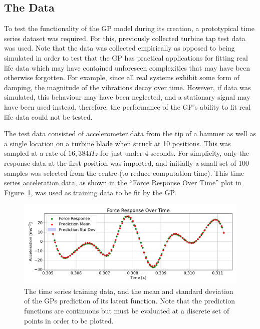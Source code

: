 \documentclass[12pt]{article}
\begin{document}
    \subsection{The Data}
    To test the functionality of the GP model during its creation, a prototypical time series dataset was required.
    For this, previously collected turbine tap test data~\cite{MEC326} was used.
    Note that the data was collected empirically as opposed to being simulated in order to test that the GP has practical applications for fitting real life data which may have contained unforeseen complexities that may have been otherwise forgotten.
    For example, since all real systems exhibit some form of damping, the magnitude of the vibrations decay over time.
    However, if data was simulated, this behaviour may have been neglected, and a stationary signal may have been used instead, therefore, the performance of the GP's ability to fit real life data could not be tested.

    The test data consisted of accelerometer data from the tip of a hammer as well as a single location on a turbine blade when struck at 10 positions.
    This was sampled at a rate of $16,384 Hz$ for just under 4 seconds.
    For simplicity, only the response data at the first position was imported, and initially a small set of 100 samples was selected from the centre (to reduce computation time).
    This time series acceleration data, as shown in the ``Force Response Over Time'' plot in Figure~\ref{fig:input-response-plot}, was used as training data to be fit by the GP\@.

    \begin{figure}[ht]
        \centering
        \includegraphics[width=1.0\linewidth]{figures/input-response-plot/input-response-plot.png}
        \caption{The time series training data, and the mean and standard deviation of the GPs prediction of its latent function. Note that the prediction functions are continuous but must be evaluated at a discrete set of points in order to be plotted.}
        \label{fig:input-response-plot}
    \end{figure}
\end{document}
